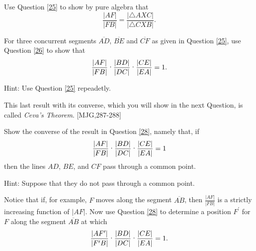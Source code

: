 \begin{question}
\label{26} Use Question \ref{25} to show by pure algebra that%
\begin{equation}
\frac{\left\vert AF\right\vert }{\left\vert FB\right\vert }=\frac{\left\vert
\triangle AXC\right\vert }{\left\vert \triangle CXB\right\vert }. \label{27}%
\end{equation}

\end{question}

\begin{question}
\label{28}  For three concurrent segments $\overline{AD}$,
$\overline{BE}$ and $\overline{CF}$ as given in Question \ref{25}, use
Question \ref{26} to show that%
\[
\frac{\left\vert AF\right\vert }{\left\vert FB\right\vert }%
\text{\textperiodcentered}\frac{\left\vert BD\right\vert }{\left\vert
DC\right\vert }\text{\textperiodcentered}\frac{\left\vert CE\right\vert
}{\left\vert EA\right\vert }=1.
\]


Hint: Use Question \ref{25} repeadetly. 
\end{question}

This last result with its converse, which you will show in the next Question,
is called \textit{Ceva's Theorem}. [MJG,287-288]

\begin{question}
Show the converse of the result in Question \ref{28}, namely
that, if%
\[
\frac{\left\vert AF\right\vert }{\left\vert FB\right\vert }%
\text{\textperiodcentered}\frac{\left\vert BD\right\vert }{\left\vert
DC\right\vert }\text{\textperiodcentered}\frac{\left\vert CE\right\vert
}{\left\vert EA\right\vert }=1
\]
then the lines $AD$, $BE$, and $CF$ pass through a common point.

Hint: Suppose that they do not pass through a common point.
\begin{image}
\end{image}
Notice that if, for example, $F$ moves along the segment
$\overline{AB}$, then $\frac{\left\vert AF\right\vert }{\left\vert
FB\right\vert }$ is a strictly increasing function of $\left\vert
AF\right\vert $. Now use Question \ref{28} to determine a position
$F^{\prime}$ for $F$ along the segment $\overline{AB}$ at which
\[
\frac{\left\vert AF^{\prime}\right\vert }{\left\vert F^{\prime}B\right\vert
}\text{\textperiodcentered}\frac{\left\vert BD\right\vert }{\left\vert
DC\right\vert }\text{\textperiodcentered}\frac{\left\vert CE\right\vert
}{\left\vert EA\right\vert }=1.
\]
\end{question}

